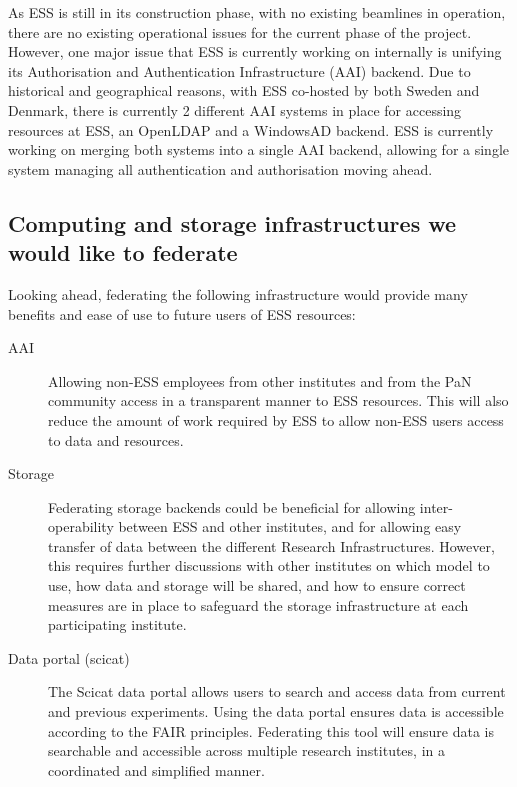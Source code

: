 As ESS is still in its construction phase, with no existing beamlines in operation, there are no existing operational issues for the current phase of the project.
However, one major issue that ESS is currently working on internally is unifying its Authorisation and Authentication Infrastructure (AAI) backend.
Due to historical and geographical reasons, with ESS co-hosted by both Sweden and Denmark, there is currently 2 different AAI systems in place for accessing resources at ESS, an OpenLDAP and a WindowsAD backend.
ESS is currently working on merging both systems into a single AAI
backend, allowing for a single system managing all authentication and
authorisation moving ahead.

\subsection{Computing and storage infrastructures we would like to federate}

Looking ahead, federating the following infrastructure would provide many benefits and ease of use to future users of ESS resources:

\begin{description}
  \item[AAI]
    Allowing non-ESS employees from other institutes and from the PaN community access in a transparent manner to ESS resources.
    This will also reduce the amount of work required by ESS to allow non-ESS users access to data and resources.
  \item[Storage]
    Federating storage backends could be beneficial for allowing inter-operability between ESS and other institutes, and for allowing easy transfer of data between the different Research Infrastructures.
    However, this requires further discussions with other institutes on which model to use, how data and storage will be shared, and how to ensure correct measures are in place to safeguard the storage infrastructure at each participating institute.
  \item[Data portal (scicat)]
    The Scicat data portal allows users to search and access data from current and previous experiments.
    Using the data portal ensures data is accessible according to the FAIR principles.
    Federating this tool will ensure data is searchable and accessible across multiple research institutes, in a coordinated and simplified manner.
\end{description}
